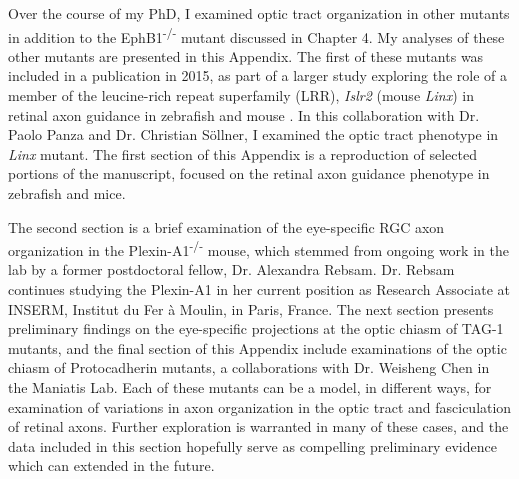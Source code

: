 Over the course of my PhD, I examined optic tract organization in other mutants in addition to the EphB1\textsuperscript{-/-} mutant discussed in Chapter 4.
My analyses of these other mutants are presented in this Appendix.
The first of these mutants was included in a publication in 2015, as part of a larger study exploring the role of a member of the leucine-rich repeat superfamily (LRR), \emph{Islr2} (mouse \emph{Linx}) in retinal axon guidance in zebrafish and mouse \cite{panza2015lrr}.
In this collaboration with Dr. Paolo Panza and Dr. Christian S\"ollner, I examined the optic tract phenotype in \emph{Linx} mutant.
The first section of this Appendix is a reproduction of selected portions of the manuscript, focused on the retinal axon guidance phenotype in zebrafish and mice.

The second section is a brief examination of the eye-specific RGC axon organization in the Plexin-A1\textsuperscript{-/-} mouse, which stemmed from ongoing work in the lab by a former postdoctoral fellow, Dr. Alexandra Rebsam.
Dr. Rebsam continues studying the Plexin-A1 in her current position as Research Associate at INSERM, Institut du Fer \`a Moulin, in Paris, France.
The next section presents preliminary findings on the eye-specific projections at the optic chiasm of TAG-1 mutants, and the final section of this Appendix include examinations of the optic chiasm of Protocadherin mutants, a collaborations with Dr. Weisheng Chen in the Maniatis Lab.
Each of these mutants can be a model, in different ways, for examination of variations in axon organization in the optic tract and fasciculation of retinal axons.
Further exploration is warranted in many of these cases, and the data included in this section hopefully serve as compelling preliminary evidence which can extended in the future.